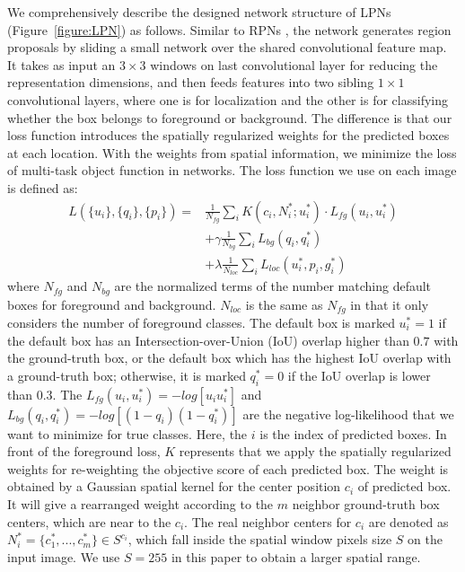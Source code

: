 \documentclass[10pt,twocolumn,letterpaper]{article}
\begin{document}
We comprehensively describe the designed network structure of LPNs (Figure~\ref{figure:LPN}) as follows. Similar to RPNs \cite{21_ren2015faster}, the network generates region proposals by sliding a small network over the shared convolutional feature map. It takes as input an $3 \times 3$ windows on last convolutional layer for reducing the representation dimensions, and then feeds features into two sibling $1 \times 1$ convolutional layers, where one is for localization and the other is for classifying whether the box belongs to foreground or background. The difference is that our loss function introduces the spatially regularized weights for the predicted boxes at each location. With the weights from spatial information, we minimize the loss of multi-task object function in networks. The loss function we use on each image is defined as:
\begin{equation} \label{eq:1}
\begin{aligned}
L(\{u_{i}\}, \{q_{i}\}, \{p_{i}\}) =& \frac{1}{N_{fg}} \sum_{i} K(c_{i}, N_{i}^{*};u_{i}^{*}) \cdot L_{fg}(u_{i}, u_{i}^{*}) \\
& + \gamma  \frac{1}{N_{bg}} \sum_{i} L_{bg}(q_{i}, q_{i}^{*}) \\
& + \lambda \frac{1}{N_{loc}} \sum_{i} L_{loc}(u_{i}^{*}, p_{i}, g_{i}^{*})
\end{aligned}
\end{equation}
where $N_{fg}$ and $N_{bg}$ are the normalized terms of the number matching default boxes for foreground and background. $N_{loc}$ is the same as $N_{fg}$ in that it only considers the number of foreground classes. The default box is marked $u_{i}^{*} = 1$ if the default box has an Intersection-over-Union (IoU) overlap higher than $0.7$ with the ground-truth box, or the default box which has the highest IoU overlap with a ground-truth box; otherwise, it is marked $q_{i}^{*} = 0$ if the IoU overlap is lower than $0.3$. The $L_{fg}(u_{i}, u_{i}^{*}) = -log[u_{i}u_{i}^{*}]$ and $L_{bg}(q_{i}, q_{i}^{*}) = -log[(1-q_{i})(1-q_{i}^{*})]$ are the negative log-likelihood that we want to minimize for true classes. Here, the $i$ is the index of predicted boxes. In front of the foreground loss, $K$ represents that we apply the spatially regularized weights for re-weighting the objective score of each predicted box. The weight is obtained by a Gaussian spatial kernel for the center position $c_{i}$ of predicted box. It will give a rearranged weight according to the $m$ neighbor ground-truth box centers, which are near to the $c_{i}$. The real neighbor centers for $c_{i}$ are denoted as $N_{i}^{*} = \{c_{1}^{*},...,c_{m}^{*}\} \in S^{c_{i}}$, which fall inside the spatial window pixels size $S$ on the input image. We use $S = 255$ in this paper to obtain a larger spatial range.  
\end{document}
